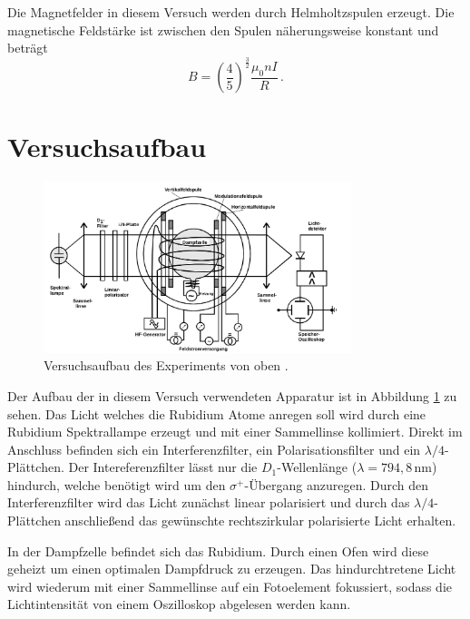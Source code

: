 Die Magnetfelder in diesem Versuch werden durch Helmholtzspulen erzeugt.
Die magnetische Feldstärke ist zwischen den Spulen näherungsweise konstant und beträgt
\begin{equation}
B= \left(\frac{4}{5}\right)^{\frac{3}{2}}\frac{\mu_0 n I}{R} \, .
\end{equation}

\section{Versuchsaufbau}
\FloatBarrier
\begin{figure}[h]
    \centering
    \includegraphics[width=0.8\textwidth]{aufbau.png}
    \caption{Versuchsaufbau des Experiments von oben \cite{quelle01}.}
    \label{fig:tfig7}
\end{figure}
\FloatBarrier
\noindent
Der Aufbau der in diesem Versuch verwendeten Apparatur ist in Abbildung \ref{fig:tfig7} zu sehen.
Das Licht welches die Rubidium Atome anregen soll wird durch eine Rubidium Spektrallampe erzeugt und mit einer Sammellinse kollimiert.
Direkt im Anschluss befinden sich ein Interferenzfilter, ein Polarisationsfilter und ein $\lambda/4$-Plättchen.
Der Intereferenzfilter lässt nur die $D_1$-Wellenlänge ($\lambda = 794,8 \, \si{\nm}$) hindurch, welche benötigt wird um den $\sigma^{+}$-Übergang anzuregen.
Durch den Interferenzfilter wird das Licht zunächst linear polarisiert und durch das $\lambda/4$-Plättchen anschließend das gewünschte rechtszirkular polarisierte Licht erhalten.

In der Dampfzelle befindet sich das Rubidium.
Durch einen Ofen wird diese geheizt um einen optimalen Dampfdruck zu erzeugen.
Das hindurchtretene Licht wird wiederum mit einer Sammellinse auf ein Fotoelement fokussiert, sodass die Lichtintensität von einem Oszilloskop abgelesen werden kann.

